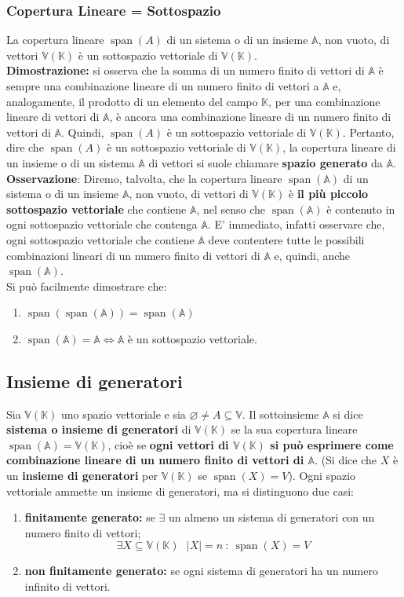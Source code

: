 \documentclass{article}
\DeclareMathOperator{\Span}{span}
\newcommand{\sa}{\Span(\mathbb{A})}
\newcommand{\V}{\mathbb{V} (\mathbb{K})}
\begin{document}
\subsubsection{Copertura Lineare = Sottospazio}
La copertura lineare $\Span(A)$ di un sistema o di un insieme $\mathbb A$, non
vuoto, di vettori $\mathbb V(\mathbb K)$ è un sottospazio vettoriale di
$\mathbb V(\mathbb K)$.\\ \textbf{Dimostrazione:} si osserva che la somma di un
numero finito di vettori di $\mathbb A$ è sempre una combinazione lineare di un
numero finito di vettori a $\mathbb A$ e, analogamente, il prodotto di un
elemento del campo $\mathbb K$, per una combinazione lineare di vettori di
$\mathbb A$, è ancora una combinazione lineare di un numero finito di vettori
di $\mathbb A$. Quindi, $\Span(A)$ è un sottospazio vettoriale di $\V$.
Pertanto, dire che $\Span(A)$ è un sottospazio vettoriale di $\V$, la copertura
lineare di un insieme o di un sistema $\mathbb A$ di vettori si suole chiamare
\textbf{spazio generato} da $\mathbb A$.\\ \textbf{Osservazione}: Diremo,
talvolta, che la copertura lineare $\sa$ di un sistema o di un insieme $\mathbb
    A$, non vuoto, di vettori di $\V$ è \textbf{il più piccolo sottospazio
    vettoriale} che contiene $\mathbb A$, nel senso che $\sa$ è contenuto in ogni
sottospazio vettoriale che contenga $\mathbb A$. E' immediato, infatti
osservare che, ogni sottospazio vettoriale che contiene $\mathbb A$ deve
contentere tutte le possibili combinazioni lineari di un numero finito di
vettori di $\mathbb A$ e, quindi, anche $\sa$.\\ Si può facilmente dimostrare
che:
\begin{enumerate}
    \item $\Span(\sa) = \sa$
    \item $\sa = \mathbb A \iff \mathbb A$ è un sottospazio vettoriale.
\end{enumerate}

\subsection{Insieme di generatori}
Sia $\V$ uno spazio vettoriale e sia $\varnothing \ne A \subseteq \mathbb V$.
Il sottoinsieme $\mathbb A$ si dice \textbf{sistema o insieme di generatori} di
$\V$ se la sua copertura lineare $\sa = \V$, cioè se \textbf{ogni vettori di
    $\V$ si può esprimere come combinazione lineare di un numero finito di vettori
    di $\mathbb A$}. (Si dice che $X$ è un \textbf{insieme di generatori} per $\V$
se $\Span(X) = V$). Ogni spazio vettoriale ammette un insieme di generatori, ma
si distinguono due casi:
\begin{enumerate}
    \item \textbf{finitamente generato:} se $\exists$ un almeno un sistema di generatori con un numero finito di vettori;
          \[
              \exists X \subseteq \V \ \ \ |X|=n \ : \ \Span(X) = V
          \]
    \item \textbf{non finitamente generato:} se ogni sistema di generatori ha un numero infinito di vettori.
\end{enumerate}
\end{document}
